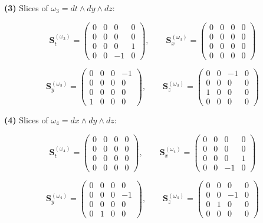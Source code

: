 \textbf{(3)} Slices of \(\omega_3 = dt\wedge dy\wedge dz\):

\[
\mathbf{S}_{t}^{(\omega_3)}=\begin{pmatrix}0&0&0&0\\[2pt]0&0&0&0\\[2pt]0&0&0&1\\[2pt]0&0&-1&0\end{pmatrix},\qquad
\mathbf{S}_{x}^{(\omega_3)}=\begin{pmatrix}0&0&0&0\\[2pt]0&0&0&0\\[2pt]0&0&0&0\\[2pt]0&0&0&0\end{pmatrix}
\]

\[
\mathbf{S}_{y}^{(\omega_3)}=\begin{pmatrix}0&0&0&-1\\[2pt]0&0&0&0\\[2pt]0&0&0&0\\[2pt]1&0&0&0\end{pmatrix},\qquad
\mathbf{S}_{z}^{(\omega_3)}=\begin{pmatrix}0&0&-1&0\\[2pt]0&0&0&0\\[2pt]1&0&0&0\\[2pt]0&0&0&0\end{pmatrix}
\]

\textbf{(4)} Slices of \(\omega_4 = dx\wedge dy\wedge dz\):

\[
\mathbf{S}_{t}^{(\omega_4)}=\begin{pmatrix}0&0&0&0\\[2pt]0&0&0&0\\[2pt]0&0&0&0\\[2pt]0&0&0&0\end{pmatrix},\qquad
\mathbf{S}_{x}^{(\omega_4)}=\begin{pmatrix}0&0&0&0\\[2pt]0&0&0&0\\[2pt]0&0&0&1\\[2pt]0&0&-1&0\end{pmatrix}
\]

\[
\mathbf{S}_{y}^{(\omega_4)}=\begin{pmatrix}0&0&0&0\\[2pt]0&0&0&-1\\[2pt]0&0&0&0\\[2pt]0&1&0&0\end{pmatrix},\qquad
\mathbf{S}_{z}^{(\omega_4)}=\begin{pmatrix}0&0&0&0\\[2pt]0&0&-1&0\\[2pt]0&1&0&0\\[2pt]0&0&0&0\end{pmatrix}
\]

